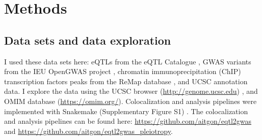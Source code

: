 

%
%
%
%

\section*{Methods}\label{sec:methods}

\subsection*{Data sets and data exploration}

I used these data sets here: eQTLs from the eQTL Catalogue \citep{2021.Alasoo.Kerimov}, GWAS variants from the IEU OpenGWAS project \citep{2021.Marcora.Lyon}, chromatin immunoprecipitation (ChIP) transcription factors peaks from the ReMap database \citep{2021.Ballester.Hammal}, and UCSC annotation data.
%
I explore the data using the UCSC browser (\url{http://genome.ucsc.edu}) \citep{2021.Kent.Lee}, and OMIM database (\url{https://omim.org/}).
%
Colocalization and analysis pipelines were implemented with Snakemake (Supplementary Figure S1) .
%
The colocalization and analysis pipelines can be found here: \url{https://github.com/aitgon/eqtl2gwas} and \url{https://github.com/aitgon/eqtl2gwas_pleiotropy}.

